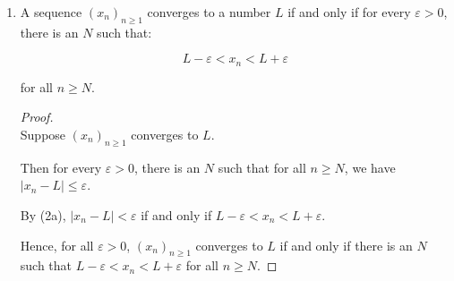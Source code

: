 \documentclass[12pt, letterpaper]{article}
\renewcommand{\epsilon}{\varepsilon}
\theoremstyle{definition} %
\begin{document}
\begin{enumerate}[label=\bfseries\arabic*.]
\begin{enumerate}[label=\bfseries(\alph*)]
\begin{proof}
        If $|x-L| = -(x-L)$, then:
        \begin{eqnarray*}
            -\epsilon < -(x-L) < \epsilon \\
            \epsilon > x-L > -\epsilon \\
            L + \epsilon > x > L - \epsilon 
        \end{eqnarray*}

        Conversely, suppose that $L-\epsilon < x < L+\epsilon$. Then we have:
        \begin{equation*}
            -\epsilon < x-L < \epsilon
        \end{equation*}

        We know that $|x-L| = \pm(x-L)$. 

        If $|x-L| = x-L$, we already have $x-L < \epsilon$.

        Now suppose $|x-L| = -(x-L)$. By assumption, we have $-\epsilon < x-L$.
        \begin{equation*}
            -\epsilon < x-L \implies -(x-L) < \epsilon
        \end{equation*}

        Hence, $|x-L| < \epsilon$ if and only if $L-\epsilon < x < L + \epsilon$.
    \end{proof}

    \item A sequence $(x_n)_{n \geq 1}$ converges to a number $L$ if and only if
    for every $\epsilon > 0$, there is an $N$ such that:

    \begin{equation*} 
        L-\epsilon < x_n < L+\epsilon
    \end{equation*} 

    for all $n \geq N$.

    \begin{proof} ~\\
        Suppose $(x_n)_{n \geq 1}$ converges to $L$.

        Then for every $\epsilon > 0$, there is an $N$ such that for all 
        $n \geq N$, we have $|x_n-L| \leq \epsilon$.

        By (2a), $|x_n - L| < \epsilon$ if and only if $L-\epsilon < x_n < L + \epsilon$.

        Hence, for all $\epsilon > 0$, $(x_n)_{n \geq 1}$ converges to $L$ if 
        and only if there is an $N$ such that $L-\epsilon < x_n < L + \epsilon$ 
        for all $n \geq N$.
    \end{proof}


\end{enumerate}
\end{enumerate}
\end{document}
